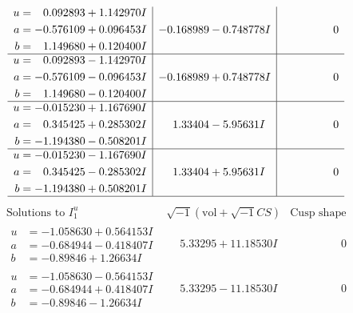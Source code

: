 \documentclass[1p]{elsarticle_modified}
\theoremstyle{definition}
\newcommand{\I}{\sqrt{-1}}
\begin{document}
$$\begin{array}{c|c|c}
\begin{aligned}
u &= \phantom{-}0.092893 + 1.142970 I \\
a &= -0.576109 + 0.096453 I \\
b &= \phantom{-}1.149680 + 0.120400 I\end{aligned}
 & -0.168989 - 0.748778 I & \phantom{-0.000000 } 0 \\ \hline\begin{aligned}
u &= \phantom{-}0.092893 - 1.142970 I \\
a &= -0.576109 - 0.096453 I \\
b &= \phantom{-}1.149680 - 0.120400 I\end{aligned}
 & -0.168989 + 0.748778 I & \phantom{-0.000000 } 0 \\ \hline\begin{aligned}
u &= -0.015230 + 1.167690 I \\
a &= \phantom{-}0.345425 + 0.285302 I \\
b &= -1.194380 - 0.508201 I\end{aligned}
 & \phantom{-}1.33404 - 5.95631 I & \phantom{-0.000000 } 0 \\ \hline\begin{aligned}
u &= -0.015230 - 1.167690 I \\
a &= \phantom{-}0.345425 - 0.285302 I \\
b &= -1.194380 + 0.508201 I\end{aligned}
 & \phantom{-}1.33404 + 5.95631 I & \phantom{-0.000000 } 0\\
 \hline 
 \end{array}$$\newpage$$\begin{array}{c|c|c}  
\text{Solutions to }I^u_{1}& \I (\text{vol} + \sqrt{-1}CS) & \text{Cusp shape}\\
 \hline 
\begin{aligned}
u &= -1.058630 + 0.564153 I \\
a &= -0.684944 - 0.418407 I \\
b &= -0.89846 + 1.26634 I\end{aligned}
 & \phantom{-}5.33295 + 11.18530 I & \phantom{-0.000000 } 0 \\ \hline\begin{aligned}
u &= -1.058630 - 0.564153 I \\
a &= -0.684944 + 0.418407 I \\
b &= -0.89846 - 1.26634 I\end{aligned}
 & \phantom{-}5.33295 - 11.18530 I & \phantom{-0.000000 } 0 \\ \hline\begin{aligned}

\end{aligned}
\end{array}$$
\end{document}
